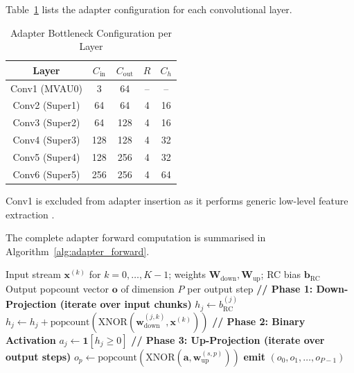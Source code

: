 \documentclass[12pt, a4paper]{report}
\numberwithin{equation}{chapter}
\numberwithin{figure}{chapter}
\numberwithin{table}{chapter}
\numberwithin{algorithm}{chapter}
\begin{document}
Table~\ref{tab:adapter_config} lists the adapter configuration for each convolutional layer.

\begin{table}[H]
\centering
\caption{Adapter Bottleneck Configuration per Layer}
\label{tab:adapter_config}
\begin{tabular}{ccccc}
\toprule
\textbf{Layer} & \textbf{$C_{\text{in}}$} & \textbf{$C_{\text{out}}$} & \textbf{$R$} & \textbf{$C_h$} \\
\midrule
Conv1 (MVAU0) & 3   & 64  & -- & --  \\
Conv2 (Super1) & 64  & 64  & 4  & 16  \\
Conv3 (Super2) & 64  & 128 & 4  & 16  \\
Conv4 (Super3) & 128 & 128 & 4  & 32  \\
Conv5 (Super4) & 128 & 256 & 4  & 32  \\
Conv6 (Super5) & 256 & 256 & 4  & 64  \\
\bottomrule
\end{tabular}
\begin{flushleft}
\footnotesize Conv1 is excluded from adapter insertion as it performs generic low-level feature extraction \cite{Chen2024ConvAdapter}.
\end{flushleft}
\end{table}

The complete adapter forward computation is summarised in Algorithm~\ref{alg:adapter_forward}.

\begin{algorithm}[htbp]
\caption{Binary Adapter Forward Computation}
\label{alg:adapter_forward}
\small
\begin{algorithmic}[1]
\Require Input stream $\mathbf{x}^{(k)}$ for $k = 0, \ldots, K-1$; weights $\mathbf{W}_{\text{down}}, \mathbf{W}_{\text{up}}$; RC bias $\mathbf{b}_{\text{RC}}$
\Ensure Output popcount vector $\mathbf{o}$ of dimension $P$ per output step
\State \textbf{// Phase 1: Down-Projection (iterate over input chunks)}
    \State $h_j \gets b_{\text{RC}}^{(j)}$ 
\EndFor
{} 
        \State $h_j \gets h_j + \text{popcount}(\text{XNOR}(\mathbf{w}_{\text{down}}^{(j,k)}, \mathbf{x}^{(k)}))$
    \EndFor
\EndFor
\State \textbf{// Phase 2: Binary Activation}
    \State $a_j \gets \mathbf{1}[h_j \geq 0]$ 
\EndFor
\State \textbf{// Phase 3: Up-Projection (iterate over output steps)}
        \State $o_p \gets \text{popcount}(\text{XNOR}(\mathbf{a}, \mathbf{w}_{\text{up}}^{(s,p)}))$
    \EndFor
    \State \textbf{emit} $(o_0, o_1, \ldots, o_{P-1})$
\EndFor
\end{algorithmic}
\end{algorithm}
\end{document}
